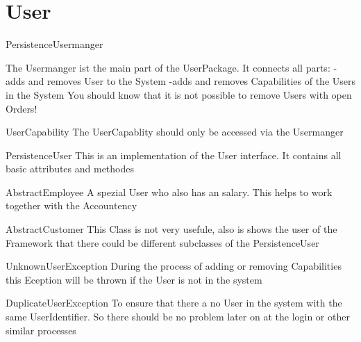 \section{User}

PersistenceUsermanger

The Usermanger ist the main part of the UserPackage. It connects all parts:
-adds and removes User to the System
-adds and removes Capabilities of the Users in the System
You should know that it is not possible to remove Users with open Orders!



UserCapability
The UserCapablity should only be accessed via the Usermanger

PersistenceUser
This is an implementation of the User interface. It contains all basic attributes and methodes


AbstractEmployee
A spezial User who also has an salary. This helps to work together with the Accountency

AbstractCustomer
This Class is not very usefule, also is shows the user of the Framework that there could be different subclasses of the PersistenceUser

UnknownUserException
During the process of adding or removing Capabilities this Eception will be thrown if the User is not in the system

DuplicateUserException
To ensure that there a no User in the system with the same UserIdentifier. So there should be no problem later on at the login or other similar processes


